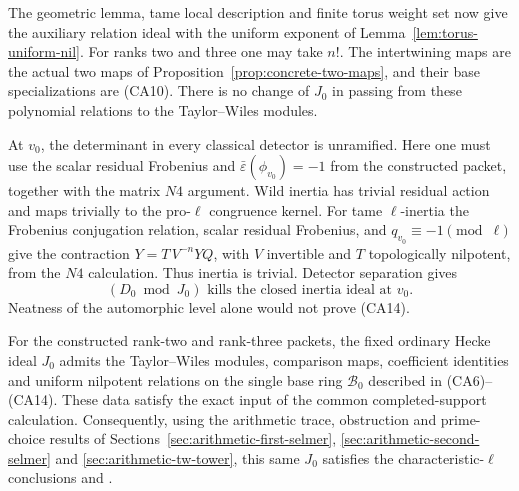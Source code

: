 The geometric lemma, tame local description and finite
torus weight set now give the auxiliary relation ideal
with the uniform exponent of
Lemma~\ref{lem:torus-uniform-nil}.
For ranks two and three one may take \(n!\).
The intertwining maps are the actual two maps of
Proposition~\ref{prop:concrete-two-maps}, and their base
specializations are (CA10).
There is no change of \(J_0\) in passing from these
polynomial relations to the Taylor--Wiles modules.

At \(v_0\), the determinant in every classical detector
is unramified. Here one must use the scalar residual
Frobenius and
\(\bar\varepsilon(\phi_{v_0})=-1\) from the constructed
packet, together with the matrix \(N4\) argument.
Wild inertia has trivial residual action and maps
trivially to the pro-\(\ell\) congruence kernel.
For tame \(\ell\)-inertia the Frobenius conjugation
relation, scalar residual Frobenius, and
\(q_{v_0}\equiv-1\pmod\ell\) give the contraction
\(Y=T\,V^{-n}YQ\), with \(V\) invertible and \(T\)
topologically nilpotent, from the \(N4\) calculation.
Thus inertia is trivial. Detector separation gives
\[
 (D_0\bmod J_0)\text{ kills the closed inertia ideal at }v_0.
                                                               \tag{CA14}
\]
Neatness of the automorphic level alone would not prove
(CA14).

\begin{srproposition}
\label{prop:common-ordinary-actual-input}
For the constructed rank-two and rank-three packets,
the fixed ordinary Hecke ideal \(J_0\) admits the
Taylor--Wiles modules, comparison maps, coefficient
identities and uniform nilpotent relations on the
single base ring \(\mathcal B_0\) described in
(CA6)--(CA14). These data satisfy the exact
 input of the common completed-support
calculation.
Consequently, using the arithmetic trace, obstruction
and prime-choice results of
Sections~\ref{sec:arithmetic-first-selmer},
\ref{sec:arithmetic-second-selmer} and
\ref{sec:arithmetic-tw-tower}, this same \(J_0\)
satisfies the characteristic-\(\ell\) conclusions
 and .
\end{srproposition}

